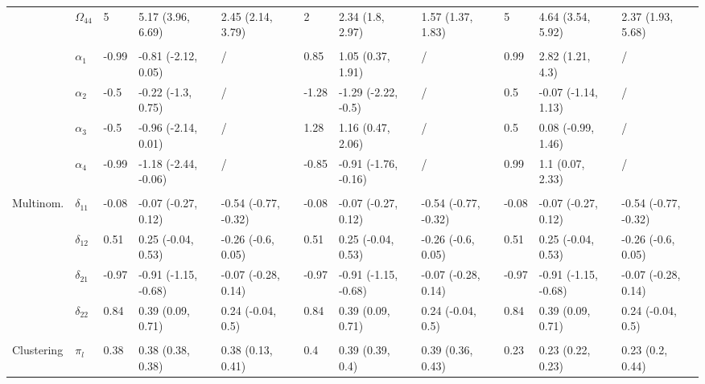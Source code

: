 \documentclass{article}
\begin{document}
\begin{landscape}
\begin{table}[t]
\begin{tabular}{lllllllllll}
\hspace{1em} & $\Omega_{44}$ & 5 & 5.17 (3.96, 6.69) & 2.45 (2.14, 3.79) & 2 & 2.34 (1.8, 2.97) & 1.57 (1.37, 1.83) & 5 & 4.64 (3.54, 5.92) & 2.37 (1.93, 5.68)\\
\addlinespace[0.3em]
\multicolumn{11}{l}{\textbf{ }}\\
\hspace{1em} & $\alpha_{1}$ & -0.99 & -0.81 (-2.12, 0.05) & / & 0.85 & 1.05 (0.37, 1.91) & / & 0.99 & 2.82 (1.21, 4.3) & /\\
\hspace{1em} & $\alpha_{2}$ & -0.5 & -0.22 (-1.3, 0.75) & / & -1.28 & -1.29 (-2.22, -0.5) & / & 0.5 & -0.07 (-1.14, 1.13) & /\\
\hspace{1em} & $\alpha_{3}$ & -0.5 & -0.96 (-2.14, 0.01) & / & 1.28 & 1.16 (0.47, 2.06) & / & 0.5 & 0.08 (-0.99, 1.46) & /\\
\hspace{1em} & $\alpha_{4}$ & -0.99 & -1.18 (-2.44, -0.06) & / & -0.85 & -0.91 (-1.76, -0.16) & / & 0.99 & 1.1 (0.07, 2.33) & /\\
\addlinespace[0.3em]
\multicolumn{11}{l}{\textbf{ }}\\
\hspace{1em}Multinom. & $\delta_{11}$ & -0.08 & -0.07 (-0.27, 0.12) & -0.54 (-0.77, -0.32) & -0.08 & -0.07 (-0.27, 0.12) & -0.54 (-0.77, -0.32) & -0.08 & -0.07 (-0.27, 0.12) & -0.54 (-0.77, -0.32)\\
\hspace{1em} & $\delta_{12}$ & 0.51 & 0.25 (-0.04, 0.53) & -0.26 (-0.6, 0.05) & 0.51 & 0.25 (-0.04, 0.53) & -0.26 (-0.6, 0.05) & 0.51 & 0.25 (-0.04, 0.53) & -0.26 (-0.6, 0.05)\\
\hspace{1em} & $\delta_{21}$ & -0.97 & -0.91 (-1.15, -0.68) & -0.07 (-0.28, 0.14) & -0.97 & -0.91 (-1.15, -0.68) & -0.07 (-0.28, 0.14) & -0.97 & -0.91 (-1.15, -0.68) & -0.07 (-0.28, 0.14)\\
\hspace{1em} & $\delta_{22}$ & 0.84 & 0.39 (0.09, 0.71) & 0.24 (-0.04, 0.5) & 0.84 & 0.39 (0.09, 0.71) & 0.24 (-0.04, 0.5) & 0.84 & 0.39 (0.09, 0.71) & 0.24 (-0.04, 0.5)\\
\addlinespace[0.3em]
\multicolumn{11}{l}{\textbf{ }}\\
\hspace{1em}Clustering & $\pi_l$ & 0.38 & 0.38 (0.38, 0.38) & 0.38 (0.13, 0.41) & 0.4 & 0.39 (0.39, 0.4) & 0.39 (0.36, 0.43) & 0.23 & 0.23 (0.22, 0.23) & 0.23 (0.2, 0.44)\\
\bottomrule
\end{tabular}
\end{table}
\end{landscape}
\end{document}
